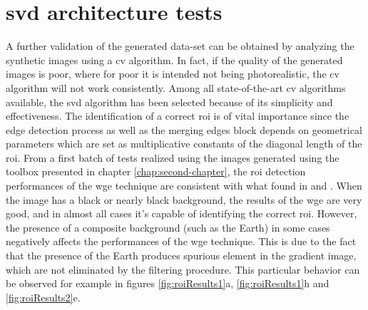 \section{\acrshort{svd} architecture tests}
A further validation of the generated data-set can be obtained by analyzing the synthetic images using a \acrshort{cv} algorithm. In fact, if the quality of the generated images is poor, where for poor it is intended not being photorealistic, the \acrshort{cv} algorithm will not work consistently. Among all state-of-the-art \acrshort{cv} algorithms available, the \acrshort{svd} algorithm has been selected because of its simplicity and effectiveness.
The identification of a correct \acrshort{roi} is of vital importance since the edge detection process as well as the merging edges block depends on geometrical parameters which are set as multiplicative constants of the diagonal length of the \acrshort{roi}. From a first batch of tests realized using the images generated using the toolbox presented in chapter \ref{chap:second-chapter}, the \acrshort{roi} detection performances of the \acrshort{wge} technique are consistent with what found in \cite{Sharma2018} and \cite{fracchio2019}. When the image has a black or nearly black background, the results of the \acrshort{wge} are very good, and in almost all cases it's capable of identifying the correct \acrshort{roi}. However, the presence of a composite background (such as the Earth) in some cases negatively affects the performances of the \acrshort{wge} technique. This is due to the fact that the presence of the Earth produces spurious element in the gradient image, which are not eliminated by the filtering procedure. This particular behavior can be observed for example in figures \ref{fig:roiResults1}a, \ref{fig:roiResults1}h and \ref{fig:roiResults2}e.

